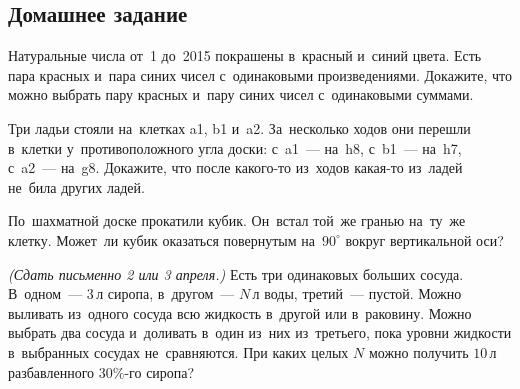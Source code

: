 

\subsection*{Домашнее задание}



\begin{problems}

\item
Натуральные числа от~1 до~2015 покрашены в~красный и~синий цвета.
Есть пара красных и~пара синих чисел с~одинаковыми произведениями.
Докажите, что можно выбрать пару красных и~пару синих чисел с~одинаковыми
суммами.

Три ладьи стояли на~клетках \textsf{a1}, \textsf{b1} и~\textsf{a2}.
За~несколько ходов они перешли в~клетки у~противоположного угла доски:
с~\textsf{a1}~— на~\textsf{h8},
с~\textsf{b1}~— на~\textsf{h7},
с~\textsf{a2}~— на~\textsf{g8}.
Докажите, что после какого-то из~ходов какая-то из~ладей не~била других ладей.

\item
По~шахматной доске прокатили кубик.
Он~встал той~же гранью на~ту~же клетку.
Может~ли кубик оказаться повернутым на~$90^\circ$ вокруг вертикальной оси?


\item
\emph{(Сдать письменно 2 или 3 апреля.)}
Есть три одинаковых больших сосуда.
В~одном~— $3 \, \text{л}$ сиропа, в~другом~— $N \, \text{л}$ воды,
третий~— пустой.
Можно выливать из~одного сосуда всю жидкость в~другой или в~раковину.
Можно выбрать два сосуда и~доливать в~один из~них из~третьего, пока уровни
жидкости в~выбранных сосудах не~сравняются.
При каких целых $N$ можно получить $10 \, \text{л}$ разбавленного $30\%$-го
сиропа?

\end{problems}

